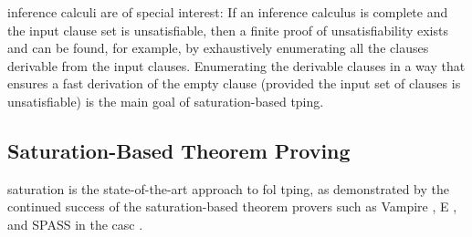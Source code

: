  inference calculi are of special interest:
If an inference calculus is complete and the input clause set is unsatisfiable,
then a finite proof of unsatisfiability exists and can be found, for example, by exhaustively enumerating all the clauses derivable from the input clauses.
Enumerating the derivable clauses in a way that ensures a fast derivation of the empty clause (provided the input set of clauses is unsatisfiable) is the main goal of saturation-based \gls{tping}.




\subsection{Saturation-Based Theorem Proving}

\Gls{saturation} is the state-of-the-art approach to \gls{fol} \gls{tping},
as demonstrated by the continued success of the saturation-based theorem provers such as Vampire \cite{DBLP:conf/cav/KovacsV13}, E \cite{DBLP:conf/cade/0001CV19}, and SPASS \cite{DBLP:conf/cade/WeidenbachDFKSW09} in the \gls{casc} \cite{Sut16}.

